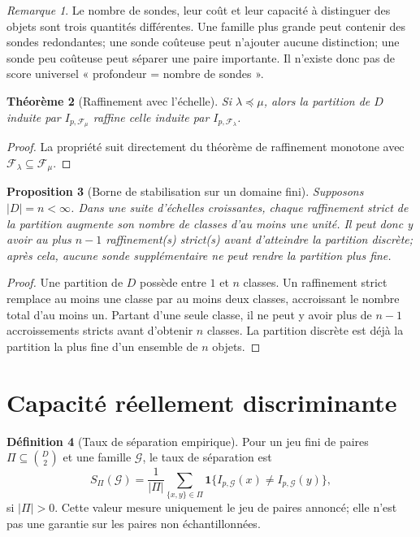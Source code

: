 \documentclass[11pt,oneside]{book}
\newtheorem{theoreme}{Théorème}[chapter]
\newtheorem{proposition}[theoreme]{Proposition}
\theoremstyle{definition}
\newtheorem{definition}[theoreme]{Définition}
\theoremstyle{remark}
\newtheorem{remarque}[theoreme]{Remarque}
\newcommand{\Fcal}{\mathcal F}
\newcommand{\Gcal}{\mathcal G}
\newcommand{\1}{\mathbf 1}
\begin{document}
\begin{remarque}
Le nombre de sondes, leur coût et leur capacité à distinguer des objets sont trois quantités différentes. Une famille plus grande peut contenir des sondes redondantes; une sonde coûteuse peut n'ajouter aucune distinction; une sonde peu coûteuse peut séparer une paire importante. Il n'existe donc pas de score universel « profondeur = nombre de sondes ».
\end{remarque}

\begin{theoreme}[Raffinement avec l'échelle]
Si $\lambda\preceq\mu$, alors la partition de $D$ induite par $I_{p,\Fcal_\mu}$ raffine celle induite par $I_{p,\Fcal_\lambda}$.
\end{theoreme}
\begin{proof}
La propriété suit directement du théorème de raffinement monotone avec $\Fcal_\lambda\subseteq\Fcal_\mu$.
\end{proof}

\begin{proposition}[Borne de stabilisation sur un domaine fini]
Supposons $|D|=n<\infty$. Dans une suite d'échelles croissantes, chaque raffinement strict de la partition augmente son nombre de classes d'au moins une unité. Il peut donc y avoir au plus $n-1$ raffinement(s) strict(s) avant d'atteindre la partition discrète; après cela, aucune sonde supplémentaire ne peut rendre la partition plus fine.
\end{proposition}
\begin{proof}
Une partition de $D$ possède entre $1$ et $n$ classes. Un raffinement strict remplace au moins une classe par au moins deux classes, accroissant le nombre total d'au moins un. Partant d'une seule classe, il ne peut y avoir plus de $n-1$ accroissements stricts avant d'obtenir $n$ classes. La partition discrète est déjà la partition la plus fine d'un ensemble de $n$ objets.
\end{proof}

\section{Capacité réellement discriminante}
\begin{definition}[Taux de séparation empirique]
Pour un jeu fini de paires $\Pi\subseteq\binom{D}{2}$ et une famille $\Gcal$, le taux de séparation est
\[
S_{\Pi}(\Gcal)=\frac{1}{|\Pi|}\sum_{\{x,y\}\in\Pi}\1\{I_{p,\Gcal}(x)\neq I_{p,\Gcal}(y)\},
\]
si $|\Pi|>0$. Cette valeur mesure uniquement le jeu de paires annoncé; elle n'est pas une garantie sur les paires non échantillonnées.
\end{definition}
\end{document}

